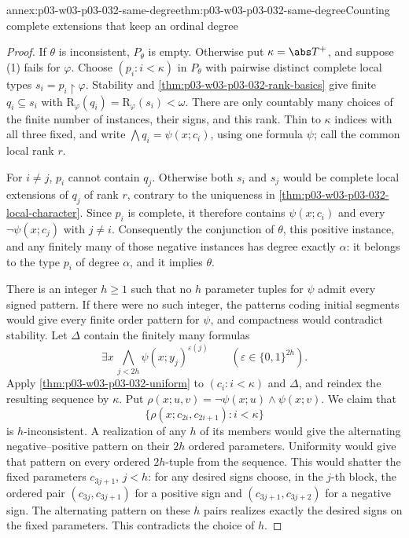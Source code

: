 \begin{annexitem}{annex:p03-w03-p03-032-same-degree}{thm:p03-w03-p03-032-same-degree}{Counting complete extensions that keep an ordinal degree}
\begin{proof}
If \(\theta\) is inconsistent, \(P_\theta\) is empty.  Otherwise put
\(\kappa=\abs T^+\), and suppose (1) fails for \(\varphi\).  Choose
\((p_i:i<\kappa)\) in \(P_\theta\) with pairwise distinct complete local
types \(s_i=p_i\mathbin{\upharpoonright}\varphi\).  Stability and
\cref{thm:p03-w03-p03-032-rank-basics} give finite
\(q_i\subseteq s_i\) with \(\mathrm R_\varphi(q_i)=
\mathrm R_\varphi(s_i)<\omega\).  There are only countably many choices
of the finite number of instances, their signs, and this rank.  Thin to
\(\kappa\) indices with all three fixed, and write
\(\bigwedge q_i=\psi(x;c_i)\), using one formula \(\psi\); call the
common local rank \(r\).

For \(i\neq j\), \(p_i\) cannot contain \(q_j\).  Otherwise both
\(s_i\) and \(s_j\) would be complete local extensions of \(q_j\) of
rank \(r\), contrary to the uniqueness in
\cref{thm:p03-w03-p03-032-local-character}.  Since \(p_i\) is complete,
it therefore contains \(\psi(x;c_i)\) and every
\(\neg\psi(x;c_j)\) with \(j\neq i\).  Consequently the conjunction of
\(\theta\), this positive instance, and any finitely many of those
negative instances has degree exactly \(\alpha\): it belongs to the
type \(p_i\) of degree \(\alpha\), and it implies \(\theta\).

There is an integer \(h\geq1\) such that no \(h\) parameter tuples for
\(\psi\) admit every signed pattern.  If there were no such integer,
the patterns coding initial segments would give every finite order pattern
for \(\psi\), and compactness would contradict stability.  Let \(\Delta\)
contain the finitely many formulas
\[
 \exists x\,\bigwedge_{j<2h}\psi(x;y_j)^{\varepsilon(j)}
 \qquad(\varepsilon\in\{0,1\}^{2h}).
\]
Apply \cref{thm:p03-w03-p03-032-uniform} to \((c_i:i<\kappa)\) and
\(\Delta\), and reindex the resulting sequence by \(\kappa\).  Put
\(\rho(x;u,v)=\neg\psi(x;u)\wedge\psi(x;v)\).  We claim that
\[
       \{\rho(x;c_{2i},c_{2i+1}):i<\kappa\}
\]
is \(h\)-inconsistent.  A realization of any \(h\) of its members would
give the alternating negative--positive pattern on their \(2h\) ordered
parameters.  Uniformity would give that pattern on every ordered
\(2h\)-tuple from the sequence.  This would shatter the fixed parameters
\(c_{3j+1}\), \(j<h\): for any desired signs choose, in the \(j\)-th
block, the ordered pair \((c_{3j},c_{3j+1})\) for a positive sign and
\((c_{3j+1},c_{3j+2})\) for a negative sign.  The alternating pattern on
these \(h\) pairs realizes exactly the desired signs on the fixed
parameters.  This contradicts the choice of \(h\).


\end{proof}
\end{annexitem}
